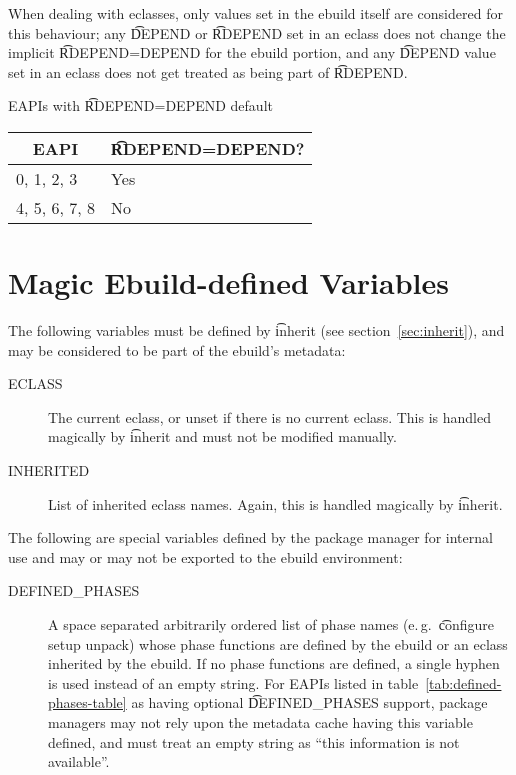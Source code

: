 When dealing with eclasses, only values set in the ebuild itself are considered for this behaviour;
any \t{DEPEND} or \t{RDEPEND} set in an eclass does not change the implicit \t{RDEPEND=DEPEND} for
the ebuild portion, and any \t{DEPEND} value set in an eclass does not get treated as being part of
\t{RDEPEND}.

\begin{centertable}{EAPIs with \t{RDEPEND=DEPEND} default}
    \label{tab:rdepend-depend-table}
    \begin{tabular}{ll}
      \toprule
      \multicolumn{1}{c}{\textbf{EAPI}} &
      \multicolumn{1}{c}{\textbf{\t{RDEPEND=DEPEND}?}} \\
      \midrule
      0, 1, 2, 3        & Yes \\
      4, 5, 6, 7, 8     & No  \\
      \bottomrule
    \end{tabular}
\end{centertable}

\section{Magic Ebuild-defined Variables}

The following variables must be defined by \t{inherit} (see section~\ref{sec:inherit}), and may be
considered to be part of the ebuild's metadata:

\begin{description}
\item[ECLASS] The current eclass, or unset if there is no current eclass. This is handled magically
    by \t{inherit} and must not be modified manually.
\item[INHERITED] List of inherited eclass names. Again, this is handled magically by \t{inherit}.
\end{description}


The following are special variables defined by the package manager for internal use and may or may
not be exported to the ebuild environment:

\begin{description}
\item[DEFINED_PHASES]  A space separated arbitrarily ordered list
    of phase names (e.\,g.\ \t{configure setup unpack}) whose phase functions are defined by the
    ebuild or an eclass inherited by the ebuild. If no phase functions are defined, a single hyphen
    is used instead of an empty string. For EAPIs listed in table~\ref{tab:defined-phases-table}
    as having optional \t{DEFINED_PHASES} support, package managers may not rely upon the metadata
    cache having this variable defined, and must treat an empty string as ``this information is not
    available''.
\end{description}


